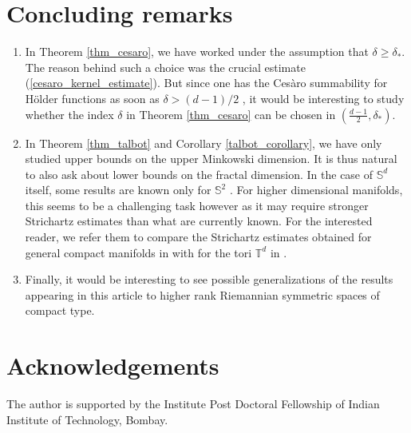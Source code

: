 \documentclass[12pt]{amsart}
\theoremstyle{definition}
\newcommand{\Sb}{\mathbb S}%
\numberwithin{equation}{section}
\begin{document}
\section{Concluding remarks}\label{sec8}
\begin{enumerate}
\item In Theorem \ref{thm_cesaro}, we have worked under the assumption that $\delta \ge \delta_*$. The reason behind such a choice was the crucial estimate (\ref{cesaro_kernel_estimate}). But since one has the Ces\`aro summability for H\"older functions as soon as $\delta>(d-1)/2$ \cite{Bonami}, it would be interesting to study whether the index $\delta$ in Theorem \ref{thm_cesaro} can be chosen in $\left(\frac{d-1}{2},\delta_*\right)$.

\medskip
  
\item In Theorem \ref{thm_talbot} and Corollary \ref{talbot_corollary}, we have only studied upper bounds on the upper Minkowski dimension. It is thus natural to also ask about lower bounds on the fractal dimension. In the case of $\Sb^d$ itself, some results are known only for $\Sb^2$ \cite[Theorems 1.1, 1.3, 3.8]{MathZ}. For higher dimensional manifolds, this seems to be a challenging task however as it may require stronger Strichartz estimates than what are currently known. For the interested reader, we refer them to compare the Strichartz estimates obtained for general compact manifolds in \cite{Burq} with for the tori $\mathbb T^d$ in \cite{Bourgain}.

\medskip

\item Finally, it would be interesting to see possible generalizations of the results appearing in this article to higher rank Riemannian symmetric spaces of compact type.
\end{enumerate}



\section*{Acknowledgements}  The author is supported by the Institute Post Doctoral Fellowship of Indian Institute of Technology, Bombay.


\end{document}
